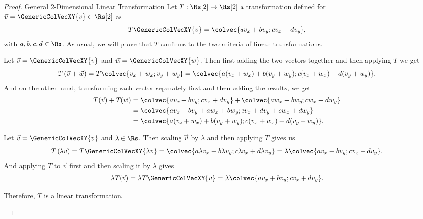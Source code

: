 \begin{proof}{General 2-Dimensional Linear Transformation}{}
	Let $T:\Rs[2]\to\Rs[2]$ a transformation defined for $\vec{v}=\GenericColVecXY{v}\in\Rs[2]$ as
	\begin{equation*}
		T\GenericColVecXY{v} = \colvec{av_{x}+bv_{y};cv_{x}+dv_{y}},
	\end{equation*}
	with $a,b,c,d\in\Rs$. As usual, we will prove that $T$ confirms to the two criteria of linear transformations.

	\begin{descitemize}
		\item[Additivity] Let $\vec{v}=\GenericColVecXY{v}$ and $\vec{w}=\GenericColVecXY{w}$. Then first adding the two vectors together and then applying $T$ we get
		\begin{equation*}
			T\left(\vec{v}+\vec{w}\right) = T\colvec{v_{x}+w_{x};v_{y}+w_{y}} = \colvec{a(v_{x}+w_{x})+b(v_{y}+w_{y});c(v_{x}+w_{x})+d(v_{y}+w_{y})}.
		\end{equation*}
		And on the other hand, transforming each vector separately first and then adding the results, we get
		\begin{align*}
			T(\vec{v}) + T(\vec{w}) & = \colvec{av_{x}+bv_{y};cv_{x}+dv_{y}} + \colvec{aw_{x}+bw_{y};cw_{x}+dw_{y}} \\
			                        & = \colvec{av_{x}+bv_{y}+aw_{x}+bw_{y};cv_{x}+dv_{y}+cw_{x}+dw_{y}}            \\
			                        & =\colvec{a(v_{x}+w_{x})+b(v_{y}+w_{y});c(v_{x}+w_{x})+d(v_{y}+w_{y})}.
		\end{align*}

		\item[Homogeneity] Let $\vec{v}=\GenericColVecXY{v}$ and $\lambda\in\Rs$. Then scaling $\vec{v}$ by $\lambda$ and then applying $T$ gives us
		\begin{equation*}
			T\left(\lambda\vec{v}\right) = T\GenericColVecXY{\lambda v} = \colvec{a\lambda v_{x}+b\lambda v_{y};c\lambda v_{x}+d\lambda v_{y}} = \lambda\colvec{av_{x}+bv_{y};cv_{x}+dv_{y}}.
		\end{equation*}
		And applying $T$ to $\vec{v}$ first and then scaling it by $\lambda$ gives
		\begin{equation*}
			\lambda T(\vec{v}) = \lambda T\GenericColVecXY{v} = \lambda\colvec{av_{x}+bv_{y};cv_{x}+dv_{y}}.
		\end{equation*}

		Therefore, $T$ is a linear transformation.
	\end{descitemize}
\end{proof}

